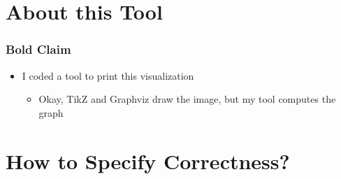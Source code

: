\documentclass[aspectratio=169,t]{beamer}
\begin{document}
\section{About this Tool}

\begin{frame}
	\frametitle{Bold Claim}
	\vspace*{5ex}
	\begin{itemize}
		\item I coded a tool to print this visualization
		\begin{itemize}
			\item<2-> Okay, TikZ and Graphviz draw the image, but my tool computes the graph
		\end{itemize}
	\end{itemize}
\end{frame}


\section{How to Specify Correctness?}
\end{document}
